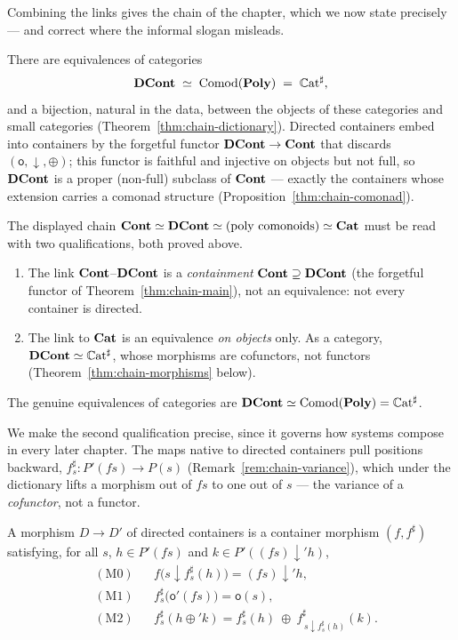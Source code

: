 Combining the links gives the chain of the chapter, which we now state precisely
--- and correct where the informal slogan misleads.

\begin{theorem}\label{thm:chain-main}
There are equivalences of categories
\[
  \mathbf{DCont}\;\simeq\;\mathrm{Comod}(\mathbf{Poly})\;=\;\mathbb C\mathrm{at}^{\sharp},
\]
and a bijection, natural in the data, between the objects of these categories and
small categories (Theorem~\ref{thm:chain-dictionary}). Directed containers embed
into containers by the forgetful functor $\mathbf{DCont}\to\mathbf{Cont}$ that discards
$(\mathsf o,\downarrow,\oplus)$; this functor is faithful and injective on
objects but not full, so $\mathbf{DCont}$ is a proper (non-full) subclass of $\mathbf{Cont}$ ---
exactly the containers whose extension carries a comonad structure
(Proposition~\ref{thm:chain-comonad}).
\end{theorem}

\begin{remark}\label{rem:chain-reading}
The displayed chain $\mathbf{Cont}\simeq\mathbf{DCont}\simeq(\text{poly comonoids})\simeq\mathbf{Cat}$
must be read with two qualifications, both proved above.
\begin{enumerate}[nosep]
  \item The link $\mathbf{Cont}$--$\mathbf{DCont}$ is a \emph{containment}
    $\mathbf{Cont}\supseteq\mathbf{DCont}$ (the forgetful functor of
    Theorem~\ref{thm:chain-main}), not an equivalence: not every container is
    directed.
  \item The link to $\mathbf{Cat}$ is an equivalence \emph{on objects} only. As a
    category, $\mathbf{DCont}\simeq\mathbb C\mathrm{at}^{\sharp}$, whose morphisms are
    cofunctors, not functors (Theorem~\ref{thm:chain-morphisms} below).
\end{enumerate}
The genuine equivalences of categories are
$\mathbf{DCont}\simeq\mathrm{Comod}(\mathbf{Poly})=\mathbb C\mathrm{at}^{\sharp}$.
\end{remark}

We make the second qualification precise, since it governs how systems compose in
every later chapter. The maps native to directed containers pull positions
backward, $f^{\sharp}_{s}\colon P'(fs)\to P(s)$ (Remark~\ref{rem:chain-variance}),
which under the dictionary lifts a morphism out of $fs$ to one out of $s$ --- the
variance of a \emph{cofunctor}, not a functor.

\begin{definition}\label{def:chain-dcm}
A morphism $D\to D'$ of directed containers is a container morphism
$(f,f^{\sharp})$ satisfying, for all $s$, $h\in P'(fs)$ and
$k\in P'((fs)\downarrow'h)$,
\begin{align*}
  &\mathrm{(M0)} && f\big(s\downarrow f^{\sharp}_{s}(h)\big)=(fs)\downarrow'h,\\
  &\mathrm{(M1)} && f^{\sharp}_{s}\big(\mathsf o'(fs)\big)=\mathsf o(s),\\
  &\mathrm{(M2)} && f^{\sharp}_{s}(h\oplus'k)
      =f^{\sharp}_{s}(h)\ \oplus\ f^{\sharp}_{\,s\downarrow f^{\sharp}_{s}(h)}(k).
\end{align*}
\end{definition}

